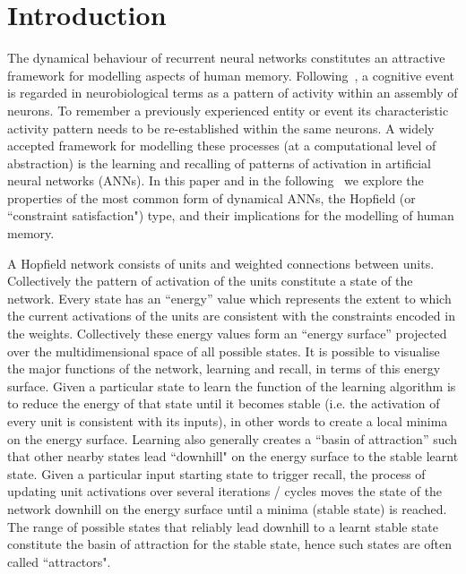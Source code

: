 


\section{Introduction}
\label{sec:Intro}

The dynamical behaviour of recurrent neural networks constitutes an attractive framework for modelling aspects of human memory.  Following~\citet{Hebb1949}, a cognitive event is regarded in neurobiological terms as a pattern of activity within an assembly of neurons.  To remember a previously experienced entity or event its characteristic activity pattern needs to be re-established within the same neurons.  A widely accepted framework for modelling these processes (at a computational level of abstraction) is the learning and recalling of patterns of activation in artificial neural networks (ANNs).  In this paper and in the following~\citep{McCallum2010b} we explore the properties of the most common form of dynamical ANNs, the Hopfield (or ``constraint satisfaction") type, and their implications for the modelling of human memory.

A Hopfield network consists of units and weighted connections between units.  Collectively the pattern of activation of the units constitute a state of the network.  Every state has an ``energy'' value which represents the extent to which the current activations of the units are consistent with the constraints encoded in the weights.  Collectively these energy values form an ``energy surface'' projected over the multidimensional space of all possible states.  It is possible to visualise the major functions of the network, learning and recall, in terms of this energy surface.  Given a particular state to learn the function of the learning algorithm is to reduce the energy of that state until it becomes stable (i.e. the activation of every unit is consistent with its inputs), in other words to create a local minima on the energy surface.  Learning also generally creates a ``basin of attraction'' such that other nearby states lead ``downhill" on the energy surface to the stable learnt state.  Given a particular input starting state to trigger recall, the process of updating unit activations over several iterations / cycles moves the state of the network downhill on the energy surface until a minima (stable state) is reached.  The range of possible states that reliably lead downhill to a learnt stable state constitute the basin of attraction for the stable state, hence such states are often called ``attractors".

